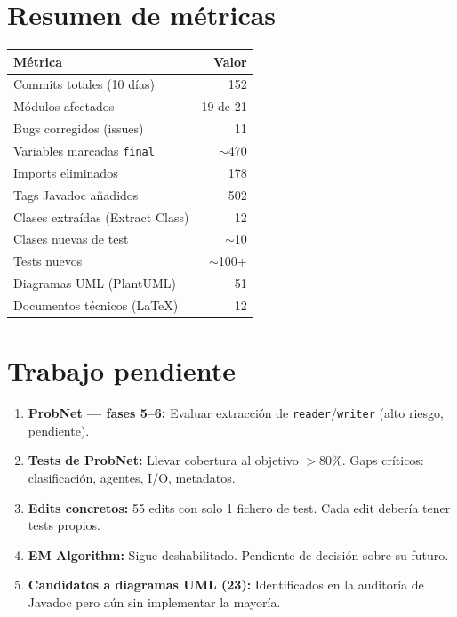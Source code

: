 \documentclass[11pt,a4paper]{article}
\begin{document}
\section{Resumen de métricas}

\begin{center}
\begin{tabular}{lr}
\toprule
\textbf{Métrica} & \textbf{Valor} \\
\midrule
Commits totales (10 días) & 152 \\
Módulos afectados & 19 de 21 \\
Bugs corregidos (issues) & 11 \\
Variables marcadas \texttt{final} & $\sim$470 \\
Imports eliminados & 178 \\
Tags Javadoc añadidos & 502 \\
Clases extraídas (Extract Class) & 12 \\
Clases nuevas de test & $\sim$10 \\
Tests nuevos & $\sim$100+ \\
Diagramas UML (PlantUML) & 51 \\
Documentos técnicos (LaTeX) & 12 \\
\bottomrule
\end{tabular}
\end{center}

\section{Trabajo pendiente}

\begin{enumerate}
  \item \textbf{ProbNet --- fases 5--6:} Evaluar extracción de \texttt{reader}/\texttt{writer} (alto riesgo, pendiente).
  \item \textbf{Tests de ProbNet:} Llevar cobertura al objetivo $>$80\%. Gaps críticos: clasificación, agentes, I/O, metadatos.
  \item \textbf{Edits concretos:} 55 edits con solo 1 fichero de test. Cada edit debería tener tests propios.
  \item \textbf{EM Algorithm:} Sigue deshabilitado. Pendiente de decisión sobre su futuro.
  \item \textbf{Candidatos a diagramas UML (23):} Identificados en la auditoría de Javadoc pero aún sin implementar la mayoría.
\end{enumerate}
\end{document}
